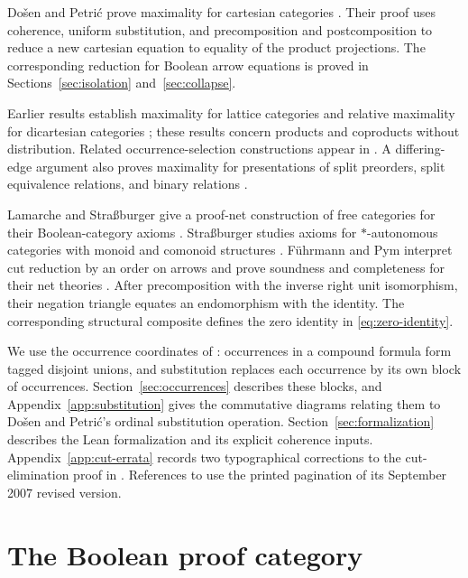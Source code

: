 \documentclass[11pt]{article}
\begin{document}
Do\v{s}en and Petri\'c prove maximality for cartesian categories
\cite[\S5]{DPCartesian}. Their proof uses coherence, uniform
substitution, and precomposition and postcomposition to reduce a new
cartesian equation to equality of the product projections. The
corresponding reduction for Boolean arrow equations is proved in
Sections~\ref{sec:isolation} and~\ref{sec:collapse}.

Earlier results establish maximality for lattice categories and relative
maximality for dicartesian categories
\cite[\S\S8--10]{DPBicartesian}; these results concern products and
coproducts without distribution. Related occurrence-selection
constructions appear in \cite[Lemma~6]{DPIsomorphic}. A differing-edge
argument also proves maximality for presentations of split preorders,
split equivalence relations, and binary relations \cite[\S16]{DPSplit}.

Lamarche and Stra{\ss}burger give a proof-net construction of free
categories for their Boolean-category axioms
\cite[Theorem~3.5.4]{LSFree}.
Stra{\ss}burger studies axioms for $*$-autonomous categories with
monoid and comonoid structures \cite{Strassburger}.
F\"uhrmann and Pym interpret cut reduction by an order on arrows and
prove soundness and completeness for their net theories
\cite[Theorems~6.4--6.5]{FP}.
After precomposition with the inverse right unit isomorphism, their
negation triangle \cite[(11), p.~28]{FP} equates an endomorphism with
the identity. The corresponding structural composite defines the
zero identity in \eqref{eq:zero-identity}.

We use the occurrence coordinates of \cite[\S9]{Notation}: occurrences
in a compound formula form tagged disjoint unions, and substitution
replaces each occurrence by its own block of occurrences.
Section~\ref{sec:occurrences} describes these blocks, and
Appendix~\ref{app:substitution} gives the commutative diagrams relating
them to Do\v{s}en and Petri\'c's ordinal substitution operation.
Section~\ref{sec:formalization} describes the Lean formalization and
its explicit coherence inputs.
Appendix~\ref{app:cut-errata} records two typographical corrections to the
cut-elimination proof in \cite{DP}.
References to \cite{DP} use the printed
pagination of its September 2007 revised version.

\section{The Boolean proof category}\label{sec:category}
\end{document}
